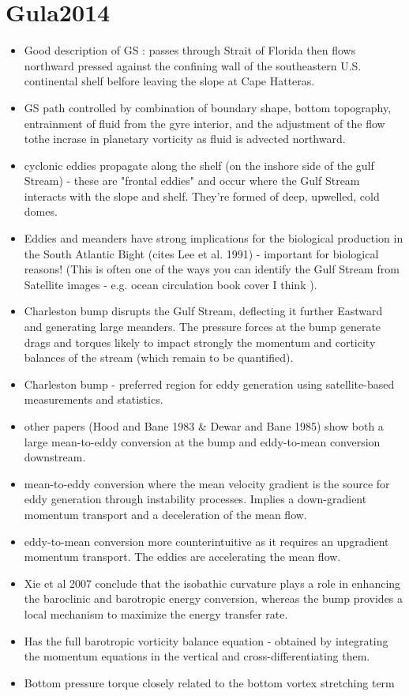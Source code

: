 \documentclass[..\Papers.tex]{subfiles}
\begin{document}
\section{Gula2014}
\citep{Gula2014}


\begin{itemize}
    \item Good description of GS : passes through Strait of Florida then flows northward pressed against the confining wall of the southeastern U.S. continental shelf belfore leaving the slope at Cape Hatteras.
    \item GS path controlled by combination of boundary shape, bottom topography, entrainment of fluid from the gyre interior, and the adjustment of the flow tothe incrase in planetary vorticity as fluid is advected northward.
    \item cyclonic eddies propagate along the shelf (on the inshore side of the gulf Stream) - these are "frontal eddies" and occur where the Gulf Stream interacts with the slope and shelf. They're formed of deep, upwelled, cold domes.
    \item Eddies and meanders have strong implications for the biological production in the South Atlantic Bight (cites Lee et al. 1991) - important for biological reasons! (This is often one of the ways you can identify the Gulf Stream from Satellite images - e.g. ocean circulation book cover I think ).
    \item Charleston bump disrupts the Gulf Stream, deflecting it further Eastward and generating large meanders. The pressure forces at the bump generate drags and torques likely to impact strongly the momentum and corticity balances of the stream (which remain to be quantified).
    \item Charleston bump - preferred region for eddy generation using satellite-based measurements and statistics.
    \item other papers (Hood and Bane 1983 \& Dewar and Bane 1985) show both a large mean-to-eddy conversion at the bump and eddy-to-mean conversion downstream.
    \item mean-to-eddy conversion where the mean velocity gradient is the source for eddy generation through instability processes. Implies a down-gradient momentum transport and a deceleration of the mean flow.
    \item eddy-to-mean conversion more counterintuitive as it requires an upgradient momentum transport. The eddies are accelerating the mean flow.
    \item Xie et al 2007 conclude that the isobathic curvature plays a role in enhancing the baroclinic and barotropic energy conversion, whereas the bump provides a local mechanism to maximize the energy transfer rate. 
    \item Has the full barotropic vorticity balance equation - obtained by integrating the momentum equations in the vertical and cross-differentiating them.
    \item Bottom pressure torque closely related to the bottom vortex stretching term \citep{Zhang207}

\end{itemize}
\end{document}
